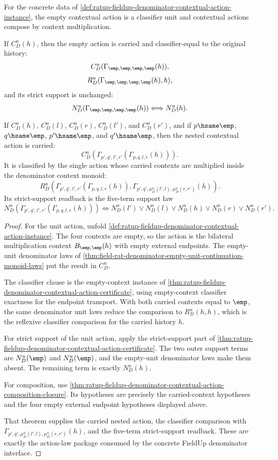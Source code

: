 \begin{theorem}
\label{thm:ratup-fieldup-denominator-contextual-action-unit-composition-laws}
For the concrete data of
\autoref{def:ratup-fieldup-denominator-contextual-action-instance}, the empty
contextual action is a classifier unit and contextual actions compose by
context multiplication.

If $C_D^u(h)$, then the empty action is carried and classifier-equal to the
original history:
$$
C_D^u(\Gamma_{\emp,\emp,\emp,\emp}(h)),
$$
$$
R_D^u(\Gamma_{\emp,\emp,\emp,\emp}(h),h),
$$
and its strict support is unchanged:
$$
N_D^u(\Gamma_{\emp,\emp,\emp,\emp}(h))
\Longleftrightarrow
N_D^u(h).
$$

If $C_D^u(h)$, $C_D^u(l)$, $C_D^u(r)$, $C_D^u(l')$, and $C_D^u(r')$, and if
$p\hsame\emp$, $q\hsame\emp$, $p'\hsame\emp$, and $q'\hsame\emp$, then the
nested contextual action is carried:
$$
C_D^u(\Gamma_{p',q',l',r'}(\Gamma_{p,q,l,r}(h))).
$$
It is classified by the single action whose carried contexts are multiplied
inside the denominator context monoid:
$$
R_D^u(\Gamma_{p',q',l',r'}(\Gamma_{p,q,l,r}(h)),
\Gamma_{p',q',\mu_D^u(l',l),\mu_D^u(r,r')}(h)).
$$
Its strict-support readback is the five-term support law
$$
N_D^u(\Gamma_{p',q',l',r'}(\Gamma_{p,q,l,r}(h)))
\Longleftrightarrow
N_D^u(l')\lor N_D^u(l)\lor N_D^u(h)\lor N_D^u(r)\lor N_D^u(r').
$$
\end{theorem}
\begin{proof}
For the unit action, unfold
\autoref{def:ratup-fieldup-denominator-contextual-action-instance}. The four
contexts are empty, so the action is the bilateral multiplication context
$B_{\emp,\emp}(h)$ with empty external endpoints. The empty-unit denominator
laws of
\autoref{thm:field-rat-denominator-empty-unit-continuation-monoid-laws} put the
result in $C_D^u$.

The classifier clause is the empty-context instance of
\autoref{thm:ratup-fieldup-denominator-contextual-action-certificate}, using
empty-context classifier exactness for the endpoint transport. With both
carried contexts equal to $\emp$, the same denominator unit laws reduce the
comparison to $R_D^u(h,h)$, which is the reflexive classifier comparison for
the carried history $h$.

For strict support of the unit action, apply the strict-support part of
\autoref{thm:ratup-fieldup-denominator-contextual-action-certificate}. The two
outer support terms are $N_D^u(\emp)$ and $N_D^u(\emp)$, and the empty-unit
denominator laws make them absent. The remaining term is exactly $N_D^u(h)$.

For composition, use
\autoref{thm:ratup-fieldup-denominator-contextual-action-composition-closure}.
Its hypotheses are precisely the carried-context hypotheses and the four empty
external endpoint hypotheses displayed above.

That theorem supplies the carried nested action, the classifier comparison
with
$\Gamma_{p',q',\mu_D^u(l',l),\mu_D^u(r,r')}(h)$, and the five-term
strict-support readback. These are exactly the action-law package consumed by
the concrete FieldUp denominator interface.
\end{proof}
